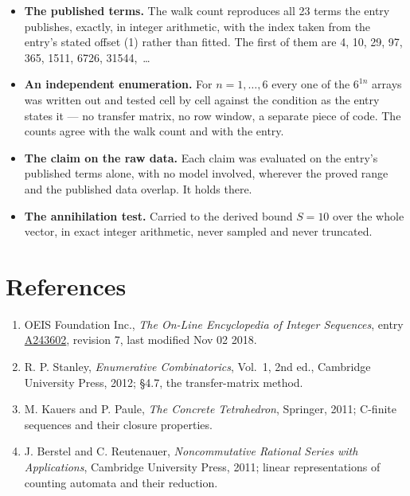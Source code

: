 \documentclass[11pt]{article}
\theoremstyle{definition}
\begin{document}
\begin{itemize}

\item {\bfseries The published terms.} The walk count reproduces all 23 terms the entry publishes, exactly, in integer arithmetic, with the index taken from the entry's stated offset (1) rather than fitted. The first of them are 4, 10, 29, 97, 365, 1511, 6726, 31544,~\dots

\item {\bfseries An independent enumeration.} For $n = 1,\dots,6$ every one of the $6^{1n}$ arrays was written out and tested cell by cell against the condition as the entry states it --- no transfer matrix, no row window, a separate piece of code. The counts agree with the walk count and with the entry.

\item {\bfseries The claim on the raw data.} Each claim was evaluated on the entry's published terms alone, with no model involved, wherever the proved range and the published data overlap. It holds there.

\item {\bfseries The annihilation test.} Carried to the derived bound $S = 10$ over the whole vector, in exact integer arithmetic, never sampled and never truncated.

\end{itemize}

\section{References}

\begin{enumerate}

\item OEIS Foundation Inc., \emph{The On-Line Encyclopedia of Integer Sequences}, entry \href{https://oeis.org/A243602}{A243602}, revision 7, last modified Nov 02 2018.

\item R. P. Stanley, \emph{Enumerative Combinatorics}, Vol.~1, 2nd ed., Cambridge University Press, 2012; \S4.7, the transfer-matrix method.

\item M. Kauers and P. Paule, \emph{The Concrete Tetrahedron}, Springer, 2011; C-finite sequences and their closure properties.

\item J. Berstel and C. Reutenauer, \emph{Noncommutative Rational Series with Applications}, Cambridge University Press, 2011; linear representations of counting automata and their reduction.

\end{enumerate}
\end{document}
